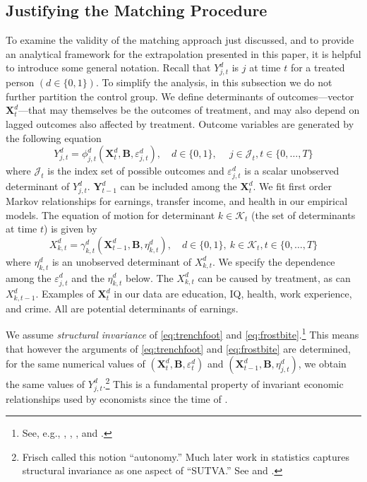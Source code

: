 \begin{figure}
\end{figure}

\subsection{Justifying the Matching Procedure} \label{section:just}

To examine the validity of the matching approach just discussed, and to provide an analytical framework for the extrapolation presented in this paper, it is helpful to introduce some general notation. Recall that $Y^d_{j,t}$ is $j$ at time $t$ for a treated person $(d\in\{0,1\})$. To simplify the analysis, in this subsection we do not further partition the control group. We define determinants of outcomes---vector $\bm{X}^d_t$---that may themselves be the outcomes of treatment, and may also depend on lagged outcomes also affected by treatment. Outcome variables are generated by the following equation
\begin{equation}\label{eq:trenchfoot}
Y^d_{j,t} = \phi^d_{j,t} (\bm{X}^d_t, \bm{B}, \varepsilon^d_{j,t}), \quad d \in \{0,1\}, \quad \  j \in \mathcal{J}_t, t \in \{0,\dots,T\}
\end{equation}
where $\mathcal{J}_t$ is the index set of possible outcomes and $\varepsilon^d_{j,t}$ is a scalar unobserved determinant of $Y^d_{j,t}$. $\bm{Y}^d_{t-1}$ can be included among the $\bm{X}^d_{t}$. We fit first order Markov relationships for earnings, transfer income, and health in our empirical models. The equation of motion for determinant $k \in \mathcal{K}_t$ (the set of determinants at time $t$) is given by
\begin{equation}\label{eq:frostbite}
X^d_{k,t} = \gamma^d_{k,t} (\bm{X}^d_{t-1}, \bm{B}, \eta^d_{k,t}), \quad d \in \{0,1\}, \ k \in \mathcal{K}_t, t \in \{0,\dots,T\}
\end{equation}
where $\eta^d_{k,t}$ is an unobserved determinant of $X^d_{k,t}$. We specify the dependence among the $\varepsilon^d_{j,t}$ and the $\eta^d_{k,t}$ below. The $X^d_{k,t}$ can be caused by treatment, as can $X^d_{k,t-1}$. Examples of $\bm{X}^d_t$ in our data are education, IQ, health, work experience, and crime. All are potential determinants of earnings.

We assume \emph{structural invariance} of \eqref{eq:trenchfoot} and \eqref{eq:frostbite}.\footnote{See, e.g., \citet{Frisch_1938_autonomy}, \citet{Haavelmo_1943_Econometrica,Haavelmo_1944_Econometrica}, \citet{Hurwicz_1962_structural}, and \citet{Heckman_Pinto_2015_EconometTheory}.} This means that however the arguments of \eqref{eq:trenchfoot} and \eqref{eq:frostbite} are determined, for the same numerical values of $(\bm{X}^d_t, \bm{B}, \varepsilon^d_t)$ and $(\bm{X}^d_{t-1}, \bm{B}, \eta^d_{j,t})$, we obtain the same values of $Y^d_{j,t}$.\footnote{Frisch called this notion ``autonomy.'' Much later work in statistics captures structural invariance as one aspect of ``SUTVA.'' See \citet{Holland_1986_JASA} and \citet{Heckman_2008_ISR}.} This is a fundamental property of invariant economic relationships used by economists since the time of \citet{Frisch_1938_autonomy}.

